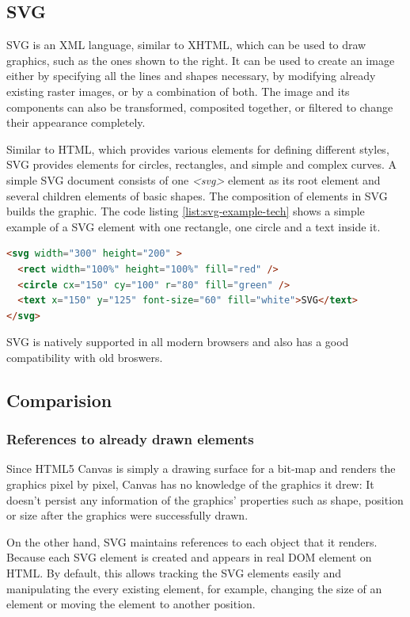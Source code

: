 \subsection{SVG}

SVG is an XML language, similar to XHTML, which can be used to draw graphics, such as the ones shown to the right. It can be used to create an image either by specifying all the lines and shapes necessary, by modifying already existing raster images, or by a combination of both. The image and its components can also be transformed, composited together, or filtered to change their appearance completely\cite{SVGintro}.

Similar to HTML, which provides various elements for defining different styles, SVG provides elements for circles, rectangles, and simple and complex curves. A simple SVG document consists of one \textit{<svg>} element as its root element and several children elements of basic shapes. The composition of elements in SVG builds the graphic. The code listing \ref{list:svg-example-tech} shows a simple example of a SVG element with one rectangle, one circle and a text inside it.

\begin{lstlisting}[language=HTML, caption=Simple Example of SVG elemnt, label={list:svg-example-tech}]
<svg width="300" height="200" >
  <rect width="100%" height="100%" fill="red" />
  <circle cx="150" cy="100" r="80" fill="green" />
  <text x="150" y="125" font-size="60" fill="white">SVG</text>
</svg>
\end{lstlisting}


SVG is natively supported in all modern browsers and also has a good compatibility with old broswers\cite{ferraiolo2000scalable}. 

\subsection{Comparision}

\subsubsection{References to already drawn elements}
Since HTML5 Canvas is simply a drawing surface for a bit-map and renders the graphics pixel by pixel, Canvas has no knowledge of the graphics it drew: It doesn’t persist any information of the graphics' properties such as shape, position or size after the graphics were successfully drawn.

On the other hand, SVG maintains references to each object that it renders. Because each SVG element is created and appears in real DOM element on HTML. By default, this allows tracking the SVG elements easily and manipulating the every existing element, for example, changing the size of an element or moving the element to another position.

